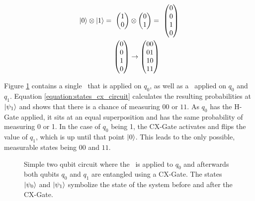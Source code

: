 \begin{equation}
    \centering
    \begin{split}
        \ket{0} \otimes \ket{1} =\ \begin{pmatrix}1 \\ 0\end{pmatrix} &\otimes \begin{pmatrix}0 \\ 1\end{pmatrix} =\ \begin{pmatrix} 0 \\ 0 \\ 1 \\ 0 \end{pmatrix} \\
        \begin{pmatrix} 0 \\ 0 \\ 1 \\ 0 \end{pmatrix} &\rightarrow \begin{pmatrix}00 \\ 01 \\ 10 \\ 11\end{pmatrix}
    \end{split}
    \label{equation:example_tensor_product}
\end{equation}

Figure \ref{circuit:example_h_cx_circuit} contains a single \hgate\ that is applied on $q_0$, as well as a \cxgate\ applied on $q_0$ and $q_1$. Equation \ref{equation:states_cx_circuit} calculates the resulting probabilities at $\ket{\psi_1}$ and shows that there is a chance of measuring $00$ or $11$. As $q_0$ has the H-Gate applied, it sits at an equal superposition and has the same probability of measuring 0 or 1. In the case of $q_0$ being 1, the CX-Gate activates and flips the value of $q_1$, which is up until that point $\ket{0}$. This leads to the only possible, measurable states being $00$ and $11$.


\begin{figure}[!h]
    \centering
    \caption{Simple two qubit circuit where the \hgate\ is applied to $q_0$ and afterwards both qubits $q_0$ and $q_1$ are entangled using a CX-Gate. The states $\ket{\psi_0}$ and $\ket{\psi_1}$ symbolize the state of the system before and after the CX-Gate.}
    \label{circuit:example_h_cx_circuit}
\end{figure}

